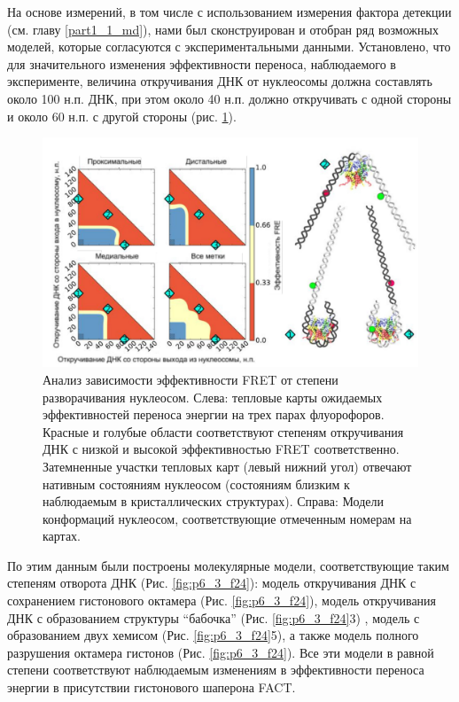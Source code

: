     
    
    На основе измерений, в том числе с использованием измерения фактора детекции (см. главу \ref{part1_1_md}), нами был сконструирован и отобран ряд возможных моделей, которые согласуются с экспериментальными данными. Установлено, что для  значительного изменения эффективности переноса, наблюдаемого в эксперименте, величина откручивания ДНК от нуклеосомы должна составлять около 100 н.п. ДНК, при этом около 40 н.п. должно откручивать с одной стороны и около 60 н.п. с другой стороны (рис. \ref{fig:p6_3_f23}).
    
\begin{figure} [H]
    \centering
    \includegraphics[width=\textwidth]{images/p6/p6_3/p6_3_f23.pdf}
    \caption[Анализ зависимости эффективности FRET от степени разворачивания нуклеосом]{Анализ зависимости эффективности FRET от степени разворачивания нуклеосом. Слева: тепловые карты ожидаемых эффективностей переноса энергии на трех парах флуорофоров. Красные и голубые области соответствуют степеням откручивания ДНК с низкой и высокой эффективностью FRET соответственно. Затемненные участки тепловых карт (левый нижний угол) отвечают нативным состояниям нуклеосом (состояниям близким к наблюдаемым в кристаллических структурах). Справа: Модели конформаций нуклеосом, соответствующие отмеченным номерам на картах.}
    \label{fig:p6_3_f23}
\end{figure}
    
    По этим данным были построены молекулярные модели, соответствующие таким степеням отворота ДНК (Рис. \ref{fig:p6_3_f24}): модель откручивания ДНК с сохранением гистонового октамера (Рис. \ref{fig:p6_3_f24}), модель откручивания ДНК с образованием структуры ``бабочка'' (Рис. \ref{fig:p6_3_f24}3) , модель с образованием двух хемисом (Рис. \ref{fig:p6_3_f24}5), а также модель полного разрушения октамера гистонов (Рис. \ref{fig:p6_3_f24}). Все эти модели в равной степени соответствуют наблюдаемым изменениям в эффективности переноса энергии в присутствии гистонового шаперона FACT.
    
